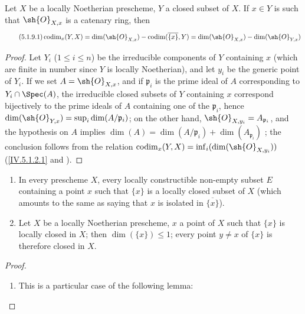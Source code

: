 \begin{proposition}[5.1.9]
\label{IV.5.1.9}
Let $X$ be a locally Noetherian prescheme, $Y$ a closed subset of $X$.
If $x\in Y$ is such that $\sh{O}_{X,x}$ is a catenary ring, then
\[
\tag{5.1.9.1}\label{IV.5.1.9.1}
  \operatorname{codim}_x(Y, X) = \dim(\sh{O}_{X,x}) - \operatorname{codim}(\overline{\{x\}}, Y) = \dim(\sh{O}_{X,x}) - \dim(\sh{O}_{Y,x})
\]
\end{proposition}

\begin{proof}
Let $Y_i$ ($1\leq i\leq n$) be the irreducible components of $Y$ containing $x$ (which are finite in number since $Y$ is locally Noetherian), and let $y_i$ be the generic point of $Y_i$.
If we set $A=\sh{O}_{X,x}$, and if $\mathfrak{p}_i$ is the prime ideal of $A$ corresponding to $Y_i\cap\Spec(A)$, the irreducible closed subsets of $Y$ containing $x$ correspond bijectively to the prime ideals of $A$ containing one of the $\mathfrak{p}_i$, hence $\dim(\sh{O}_{Y,x})=\sup_i\dim(A/\mathfrak{p}_i)$; on the other hand, $\sh{O}_{X,y_i}=A_{\mathfrak{p}_i}$, and the hypothesis on $A$ implies $\dim(A)=\dim(A/\mathfrak{p}_i)+\dim(A_{\mathfrak{p}_i})$ ; the conclusion follows from the relation $\operatorname{codim}_x(Y,X)=\inf_i(\dim(\sh{O}_{X,y_i}))$ (\eqref{IV.5.1.2.1} and ).
\end{proof}

\begin{proposition}[5.1.10]
\label{IV.5.1.10}
\begin{enumerate}[label=(\roman*)]
  \item In every prescheme $X$, every locally constructible non-empty subset $E$ containing a point $x$ such that $\{x\}$ is a locally closed subset of $X$ (which amounts to the same as saying that $x$ is isolated in $\overline{\{x\}}$).
  \item Let $X$ be a locally Noetherian prescheme, $x$ a point of $X$ such that $\{x\}$ is locally closed in $X$; then $\dim(\{x\})\leq 1$; every point $y\neq x$ of $\{x\}$ is therefore closed in $X$.
\end{enumerate}
\end{proposition}

\begin{proof}
\begin{enumerate}[label=(\roman*)]
  \item This is a particular case of the following lemma:
\end{enumerate}
\end{proof}

